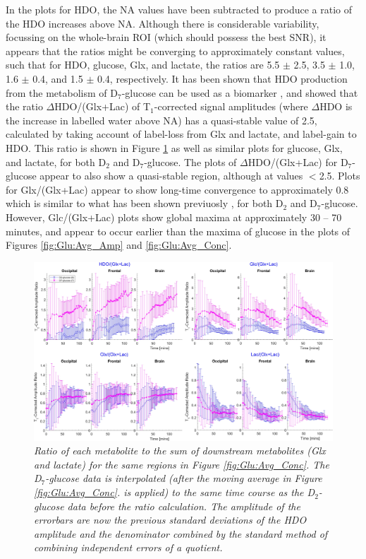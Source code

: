 In the plots for \ac{HDO}, the \ac{NA} values have been subtracted to produce a ratio of the \ac{HDO} increases above \ac{NA}. Although there is considerable variability, focussing on the whole-brain \ac{ROI} (which should possess the best \ac{SNR}), it appears that the ratios might be converging to approximately constant values, such that for \ac{HDO}, glucose, Glx, and lactate, the ratios are 5.5 $\pm$ 2.5, 3.5 $\pm$ 1.0, 1.6 $\pm$ 0.4, and 1.5 $\pm$ 0.4, respectively. It has been shown that \ac{HDO} production from the metabolism of D$_7$-glucose can be used as a biomarker \cite{Mahar2021DeuteratedGlucose}, and showed that the ratio $\Delta$HDO/(Glx+Lac) of T$_1$-corrected signal amplitudes (where $\Delta$HDO is the increase in labelled water above \ac{NA}) has a quasi-stable value of 2.5, calculated by taking account of label-loss from Glx and lactate, and label-gain to \ac{HDO}. This ratio is shown in Figure \ref{fig:Glu:HDO_Rat} as well as similar plots for glucose, Glx, and lactate, for both D$_2$ and D$_7$-glucose. The plots of $\Delta$HDO/(Glx+Lac) for D$_7$-glucose appear to also show a quasi-stable region, although at values $<$2.5. Plots for Glx/(Glx+Lac) appear to show long-time convergence to approximately 0.8 which is similar to what has been shown previuosly \cite{Kaggie2022DeuteriumMetabolism}, for both D$_2$ and D$_7$-glucose. However, Glc/(Glx+Lac) plots show global maxima at approximately 30 – 70 minutes, and appear to occur earlier than the maxima of glucose in the plots of Figures \ref{fig:Glu:Avg_Amp} and \ref{fig:Glu:Avg_Conc}.  

\begin{figure}
    \centering
    \includegraphics[width = 1\textwidth]{Figures/Glucose/HDO_Ratio.png}
    \caption{\textit{Ratio of each metabolite to the sum of downstream metabolites (Glx and lactate) for the same regions in Figure \ref{fig:Glu:Avg_Conc}. The D$_7$-glucose data is interpolated (after the moving average in Figure \ref{fig:Glu:Avg_Conc}. is applied) to the same time course as the D$_2$-glucose data before the ratio calculation. The amplitude of the errorbars are now the previous standard deviations of the \ac{HDO} amplitude and the denominator combined by the standard method of combining independent errors of a quotient.}}
    \label{fig:Glu:HDO_Rat}
\end{figure}

